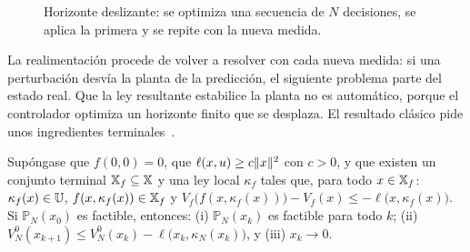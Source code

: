 \begin{figure}[h]
\centering
{}
\caption{Horizonte deslizante: se optimiza una secuencia de $N$ decisiones, se aplica la primera y se repite con la nueva medida.}
\label{fig:horizonte}
\end{figure}

La realimentación procede de volver a resolver con cada nueva medida: si una perturbación desvía la planta de la predicción, el siguiente problema parte del estado real. Que la ley resultante estabilice la planta no es automático, porque el controlador optimiza un horizonte finito que se desplaza. El resultado clásico pide unos ingredientes terminales~\cite[cap.~2]{rmd}.

\begin{teorema}\label{teo:mpc}
Supóngase que $f(0,0)=0$, que $\ell(x,u)\ge c\lVert x\rVert^{2}$ con $c>0$, y que existen un conjunto terminal $\mathbb{X}_f\subseteq\mathbb{X}$ y una ley local $\kappa_f$ tales que, para todo $x\in\mathbb{X}_f$: $\kappa_f(x)\in\mathbb{U}$, $f(x,\kappa_f(x))\in\mathbb{X}_f$ y $V_f\bigl(f(x,\kappa_f(x))\bigr)-V_f(x)\le-\ell\bigl(x,\kappa_f(x)\bigr)$. Si $\mathbb P_N(x_0)$ es factible, entonces: (i) $\mathbb P_N(x_k)$ es factible para todo $k$; (ii) $V_N^{0}(x_{k+1})\le V_N^{0}(x_k)-\ell\bigl(x_k,\kappa_N(x_k)\bigr)$, y (iii) $x_k\to0$.
\end{teorema}

